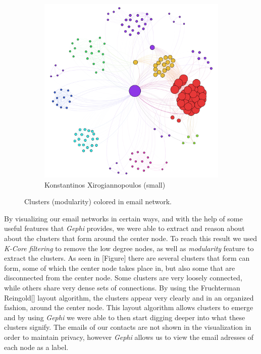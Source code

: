 \documentclass[11pt,letterpaper]{article}
\begin{document}
\begin{figure}[h]
\begin{subfigure}{0.49\textwidth}
		\includegraphics[width=\textwidth]{figures/kostas_cluster.png}
		\caption{\textsf{Konstantinos Xirogiannopoulos (small)}}
        \label{fig:kostas_cluster}
	\end{subfigure}
    \caption{\textsf{Clusters (modularity) colored in email network.}}
    \label{fig:cluster}
\end{figure}

By visualizing our email networks in certain ways, and with the help of some useful features that \textit{Gephi} provides, we were able to extract and reason about about the clusters that form around the center node. To reach this result we used \textit{K-Core filtering} to remove the low degree nodes, as well as \textit{modularity} feature to extract the clusters. As seen in [Figure] there are several clusters that form can form, some of which the center node takes place in, but also some that are disconnected from the center node. Some clusters are very loosely connected, while others share very dense sets of connections. By using the Fruchterman Reingold[] layout algorithm, the clusters appear very clearly and in an organized fashion, around the center node. This layout algorithm allows clusters to emerge and by using \textit{Gephi} we were able to then start digging deeper into what these clusters signify. The emails of our contacts are not shown in the visualization in order to maintain privacy, however \textit{Gephi} allows us to view the email adresses of each node as a label.
\end{document}
